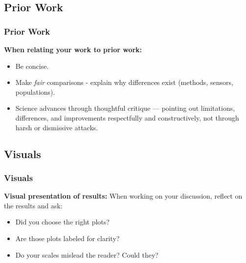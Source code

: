 \documentclass[aspectratio=169]{beamer} %
\begin{document}
	\subsection{Prior Work}
	\begin{frame}
	\frametitle{Prior Work}
		{\bf When relating your work to prior work:}
		\begin{itemize}
			\item Be concise.
			\item Make {\em fair} comparisons - explain why differences exist (methods, sensors, populations).
			\item Science advances through thoughtful critique — pointing out limitations, differences, and improvements respectfully and constructively, not through harsh or dismissive attacks.
		\end{itemize}
	\end{frame}

	\subsection{Visuals}
	\begin{frame}
	\frametitle{Visuals}
		{\bf Visual presentation of results:} When working on your discussion, reflect on the results and ask:
		\begin{itemize}
			\item Did you choose the right plots?
			\item Are those plots labeled for clarity?
			\item Do your scales mislead the reader?  Could they?
		\end{itemize}
	\end{frame}
\end{document}
